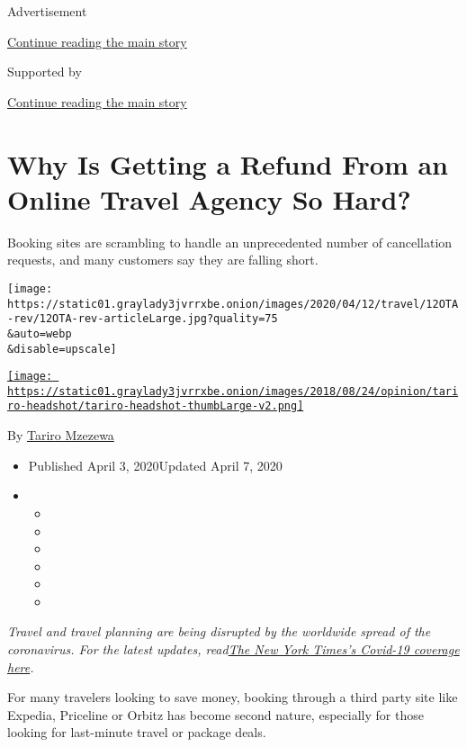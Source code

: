 Advertisement

\protect\hyperlink{after-top}{Continue reading the main story}

Supported by

\protect\hyperlink{after-sponsor}{Continue reading the main story}

\hypertarget{why-is-getting-a-refund-from-an-online-travel-agency-so-hard}{%
\section{Why Is Getting a Refund From an Online Travel Agency So
Hard?}\label{why-is-getting-a-refund-from-an-online-travel-agency-so-hard}}

Booking sites are scrambling to handle an unprecedented number of
cancellation requests, and many customers say they are falling short.

\texttt{[image: https://static01.graylady3jvrrxbe.onion/images/2020/04/12/travel/12OTA-rev/12OTA-rev-articleLarge.jpg?quality=75\\\&auto=webp\\\&disable=upscale]}

\href{https://www.nytimes3xbfgragh.onion/by/tariro-mzezewa}{\texttt{[image: https://static01.graylady3jvrrxbe.onion/images/2018/08/24/opinion/tariro-headshot/tariro-headshot-thumbLarge-v2.png]}}

By \href{https://www.nytimes3xbfgragh.onion/by/tariro-mzezewa}{Tariro
Mzezewa}

\begin{itemize}
\item
  Published April 3, 2020Updated April 7, 2020
\item
  \begin{itemize}
  \item
  \item
  \item
  \item
  \item
  \item
  \end{itemize}
\end{itemize}

\emph{Travel and travel planning are being disrupted by the worldwide
spread of the coronavirus. For the latest updates,
read}\href{https://www.nytimes3xbfgragh.onion/news-event/coronavirus?action=click\&module=RelatedLinks\&pgtype=Article}{\emph{The
New York Times's Covid-19 coverage here}}\emph{.}

For many travelers looking to save money, booking through a third party
site like Expedia, Priceline or Orbitz has become second nature,
especially for those looking for last-minute travel or package deals.


